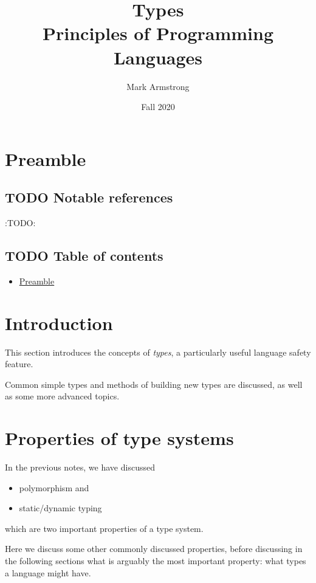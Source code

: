 \documentclass[11pt]{article}
\author{Mark Armstrong}
\date{Fall 2020}
\title{Types\\\medskip
\large Principles of Programming Languages}
\theoremstyle{definition}
\begin{document}
\maketitle

\section{Preamble}
\label{sec:org5f263db}

\subsection{{\bfseries\sffamily TODO} Notable references}
\label{sec:org4a04fd6}

:TODO:

\subsection{{\bfseries\sffamily TODO} Table of contents}
\label{sec:org6730055}

\begin{scriptsize}
\begin{itemize}
\item \hyperref[sec:org5f263db]{Preamble}
\end{itemize}
\end{scriptsize}

\section{Introduction}
\label{sec:org44c2a58}

This section introduces the concepts of \emph{types},
a particularly useful language safety feature.

Common simple types and methods of building new types are discussed,
as well as some more advanced topics.

\section{Properties of type systems}
\label{sec:orgb02556e}

In the previous notes, we have discussed
\begin{itemize}
\item polymorphism and
\item static/dynamic typing
\end{itemize}
which are two important properties of a type system.

Here we discuss some other commonly discussed properties,
before discussing in the following sections
what is arguably the most important property:
what types a language might have.
\end{document}
